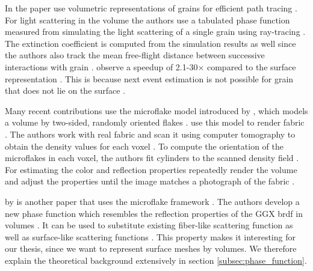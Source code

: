 In the paper  \citeauthor{meng_multi_scale_modeling_and_rendering_of_granular_materials} use volumetric representations of grains for efficient path tracing \cite{meng_multi_scale_modeling_and_rendering_of_granular_materials}.
For light scattering in the volume the authors use a tabulated phase function measured from simulating the light scattering of a single grain using ray-tracing \cite[p. 6]{meng_multi_scale_modeling_and_rendering_of_granular_materials}.
The extinction coefficient is computed from the simulation results as well since the authors also track the mean free-flight distance between successive interactions with grain \cite[p. 7]{meng_multi_scale_modeling_and_rendering_of_granular_materials}.
\citeauthor{meng_multi_scale_modeling_and_rendering_of_granular_materials} observe a speedup of 2.1-30$\times$ compared to the surface representation \cite[p. 9]{meng_multi_scale_modeling_and_rendering_of_granular_materials}.
This is because next event estimation is not possible for grain that does not lie on the surface \cite[p. 9]{meng_multi_scale_modeling_and_rendering_of_granular_materials}.

Many recent contributions use the microflake model introduced by \citeauthor{microflake}, which models a volume by two-sided, randomly oriented flakes \cite[p. 4-5]{microflake}.
\citeauthor{zhao_building_volumetric_appearance_models} use this model to render fabric \cite{zhao_building_volumetric_appearance_models}.
The authors work with real fabric and scan it using computer tomography to obtain the density values for each voxel \cite[p. 4]{zhao_building_volumetric_appearance_models}.
To compute the orientation of the microflakes in each voxel, the authors fit cylinders to the scanned density field \cite[p. 4]{zhao_building_volumetric_appearance_models}.
For estimating the color and reflection properties \citeauthor{zhao_building_volumetric_appearance_models} repeatedly render the volume and adjust the properties until the image matches a photograph of the fabric \cite[p. 5]{zhao_building_volumetric_appearance_models}.

 by \citeauthor{sggx} is another paper that uses the microflake framework \cite{sggx}.
The authors develop a new phase function which resembles the reflection properties of the GGX \ac{brdf} in volumes \cite[p. 1]{sggx}.
It can be used to substitute existing fiber-like scattering function as well as surface-like scattering functions \cite[p. 4-5]{sggx}.
This property makes it interesting for our thesis, since we want to represent surface meshes by volumes.
We therefore explain the theoretical background extensively in section \ref{subsec:phase_function}.




